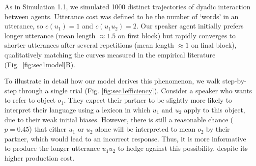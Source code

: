 As in Simulation 1.1, we simulated 1000 distinct trajectories of dyadic interaction between agents.
Utterance cost was defined to be the number of `words' in an utterance, so $c(u_1) =1$ and $c(u_1u_2)=2$.
Our speaker agent initially prefers longer utterance (mean length $\approx 1.5$ on first block) but rapidly converges to shorter utterances after several repetitions (mean length $\approx 1$ on final block), qualitatively matching the curves measured in the empirical literature (Fig.~\ref{fig:sec1model}B).

To illustrate in detail how our model derives this phenomenon, we walk step-by-step through a single trial (Fig. \ref{fig:sec1efficiency}).
Consider a speaker who wants to refer to object $o_1$. 
They expect their partner to be slightly more likely to interpret their language using a lexicon in which $u_{1}$ and $u_{2}$ apply to this object, due to their weak initial biases. 
However, there is still a reasonable chance ($p=0.45$) that either $u_1$ or $u_2$ alone will be interpreted to mean $o_2$ by their partner, which would lead to an incorrect response. 
Thus, it is more informative to produce the longer utterance $u_{1}u_{2}$ to hedge against this possibility, despite its higher production cost. 

